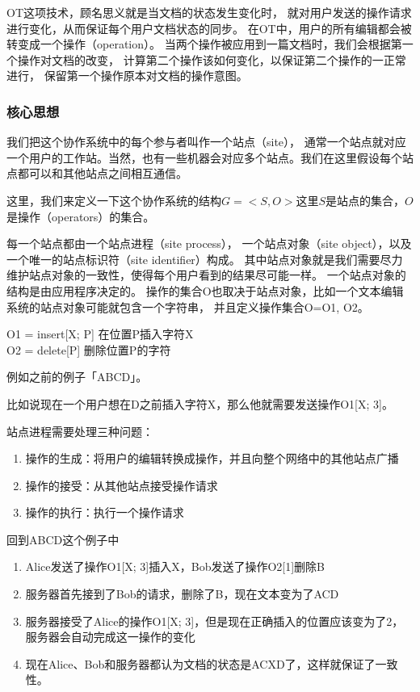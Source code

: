 \documentclass[11pt]{ctexart}
\begin{document}
OT这项技术，顾名思义就是当文档的状态发生变化时，
就对用户发送的操作请求进行变化，从而保证每个用户文档状态的同步。
在OT中，用户的所有编辑都会被转变成一个操作（operation）。
当两个操作被应用到一篇文档时，我们会根据第一个操作对文档的改变，
计算第二个操作该如何变化，以保证第二个操作的一正常进行，
保留第一个操作原本对文档的操作意图。

\subsubsection{核心思想}
我们把这个协作系统中的每个参与者叫作一个站点（site），
通常一个站点就对应一个用户的工作站。当然，也有一些机器会对应多个站点。我们在这里假设每个站点都可以和其他站点之间相互通信。

这里，我们来定义一下这个协作系统的结构$G=<S, O>$这里$S$是站点的集合，$O$是操作（operators）的集合。

每一个站点都由一个站点进程（site process），
一个站点对象（site object），以及一个唯一的站点标识符（site identifier）构成。
其中站点对象就是我们需要尽力维护站点对象的一致性，使得每个用户看到的结果尽可能一样。
一个站点对象的结构是由应用程序决定的。 操作的集合O也取决于站点对象，比如一个文本编辑系统的站点对象可能就包含一个字符串，
并且定义操作集合O={O1, O2}。
\begin{center}
O1 = insert[X; P]   在位置P插入字符X\\
O2 = delete[P]	    删除位置P的字符
\end{center}

例如之前的例子「ABCD」。

比如说现在一个用户想在D之前插入字符X，那么他就需要发送操作O1[X; 3]。

站点进程需要处理三种问题：
\begin{enumerate}
    \item 操作的生成：将用户的编辑转换成操作，并且向整个网络中的其他站点广播
    \item 操作的接受：从其他站点接受操作请求
    \item 操作的执行：执行一个操作请求
\end{enumerate}

回到ABCD这个例子中
\begin{enumerate}
    \item Alice发送了操作O1[X; 3]插入X，Bob发送了操作O2[1]删除B
    \item 服务器首先接到了Bob的请求，删除了B，现在文本变为了ACD
    \item 服务器接受了Alice的操作O1[X; 3]，但是现在正确插入的位置应该变为了2，服务器会自动完成这一操作的变化
    \item 现在Alice、Bob和服务器都认为文档的状态是ACXD了，这样就保证了一致性。
\end{enumerate}
\end{document}
